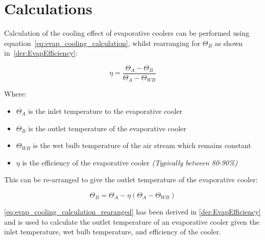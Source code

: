 
\section{Calculations}
\label{sec:evap_calculations}

Calculation of the cooling effect of evaporative coolers can be performed using equation~\ref{eq:evap_cooling_calculation}, whilst rearranging for $\Theta_{B}$ as shown in~\autoref{der:EvapEfficiency}:

\begin{equation}\label{eq:evap_cooling_calculation}
\eta = \frac{\Theta_{A}-\Theta_{B}}{\Theta_{A}-\Theta_{WB}}
\end{equation}

Where:

\begin{itemize}
    \item $\Theta_{A}$ is the inlet temperature to the evaporative cooler
    \item $\Theta_{B}$ is the outlet temperature of the evaporative cooler
    \item $\Theta_{WB}$ is the wet bulb temperature of the air stream which remains constant
    \item $\eta$ is the efficiency of the evaporative cooler \textit{(Typically between 80-90\%)}
\end{itemize}

This can be re-arranged to give the outlet temperature of the evaporative cooler:

\begin{equation}\label{eq:evap_cooling_calculation_rearanged}
\Theta_{B} = \Theta_{A} - \eta(\Theta_{A} - \Theta_{WB})
\end{equation}

\autoref{eq:evap_cooling_calculation_rearanged} has been derived in \autoref{der:EvapEfficiency} and is used to calculate the outlet temperature of an evaporative cooler given the inlet temperature, wet bulb temperature, and efficiency of the cooler.


